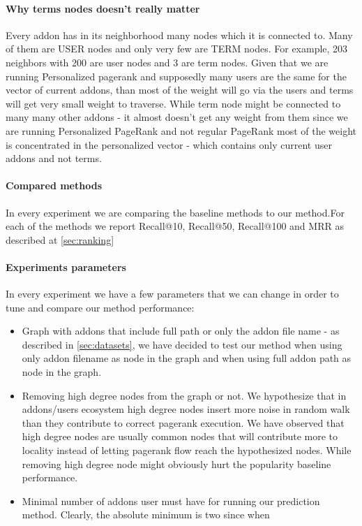 \documentclass[11pt,oneside]{book}
\begin{document}
\paragraph{Why terms nodes doesn't really matter}
Every addon has in its neighborhood many nodes which it is connected to. Many of them are USER nodes and only very few are TERM nodes. For example, 203 neighbors with 200 are user nodes and 3 are term nodes. Given that we are running Personalized pagerank and supposedly many users are the same for the vector of current addons, than most of the weight will go via the users and terms will get very small weight to traverse. While term node might be connected to many many other addons - it almost doesn't get any weight from them since we are running Personalized PageRank and not regular PageRank most of the weight is concentrated in the personalized vector - which contains only current user addons and not terms.
\paragraph{Compared methods}
In every experiment we are comparing the baseline methods to our method.For each of the methods we report Recall@10, Recall@50, Recall@100 and MRR as described at \autoref{sec:ranking}
\paragraph{Experiments parameters}
In every experiment we have a few parameters that we can change in order to tune and compare our method performance:
\begin{itemize}
\renewcommand{\labelitemiii}{$\diamond$}
\item Graph with addons that include full path or only the addon file name - as described in \autoref{sec:datasets}, we have decided to test our method when using only addon filename as node in the graph and when using full addon path as node in the graph.
\item Removing high degree nodes from the graph or not. We hypothesize that in addons/users ecosystem high degree nodes insert more noise in random walk than they contribute to correct pagerank execution. We have observed that high degree nodes are usually common nodes that will contribute more to locality instead of letting pagerank flow reach the hypothesized nodes. While removing high degree node might obviously hurt the popularity baseline performance.
\item Minimal number of addons user must have for running our prediction method. Clearly, the absolute minimum is two since when 
\end{itemize}
\end{document}

